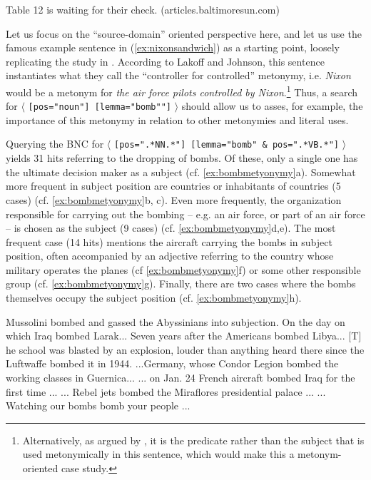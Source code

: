 \begin{exe}
\ex Table 12 is waiting for their check. (articles.baltimoresun.com)
\label{ex:tablecheck}
\end{exe}

Let us focus on the ``source-domain'' oriented perspective here, and let us use the famous example sentence in (\ref{ex:nixonsandwich}) as a starting point, loosely replicating the study in \citet{stefanowitsch_metonymies_2015}. According to Lakoff and Johnson, this sentence instantiates what they call the ``controller for controlled'' metonymy, i.e. \textit{Nixon} would be a metonym for \textit{the air force pilots controlled by Nixon}.\footnote{Alternatively, as argued by \citet{stallard_two_1993}, it is the predicate rather than the subject that is used metonymically in this sentence, which would make this a metonym-oriented case study.} Thus, a search for $\langle$ \texttt{[pos="noun"] [lemma="bomb""]} $\rangle$ should allow us to asses, for example, the importance of this metonymy in relation to other metonymies and literal uses.

Querying the BNC for $\langle$ \texttt{[pos=".*NN.*"] [lemma="bomb" \& pos=".*VB.*"]} $\rangle$ yields 31 hits referring to the dropping of bombs. Of these, only a single one has the ultimate decision maker as a subject (cf. \ref{ex:bombmetyonymy}a). Somewhat more frequent in subject position are countries or inhabitants of countries (5 cases) (cf. \ref{ex:bombmetyonymy}b, c). Even more frequently, the organization responsible for carrying out the bombing -- e.g. an air force, or part of an air force -- is chosen as the subject (9 cases) (cf. \ref{ex:bombmetyonymy}d,e). The most frequent case (14 hits) mentions the aircraft carrying the bombs in subject position, often accompanied by an adjective referring to the country whose military operates the planes (cf \ref{ex:bombmetyonymy}f) or some other responsible group (cf. \ref{ex:bombmetyonymy}g). Finally, there are two cases where the bombs themselves occupy the subject position (cf. \ref{ex:bombmetyonymy}h).

\begin{exe}
\ex
\begin{xlist} 
\label{ex:bombmetyonymy}
\ex Mussolini bombed and gassed the Abyssinians into subjection.
\ex On the day on which Iraq bombed Larak...
\ex Seven years after the Americans bombed Libya...
\ex $[$T$]$he school was blasted by an explosion, louder than anything heard there since the Luftwaffe bombed it in 1944.
\ex ...Germany, whose Condor Legion bombed the working classes in Guernica...
\ex ... on Jan. 24 French aircraft bombed Iraq for the first time ...
\ex ... Rebel jets bombed the Miraflores presidential palace ...
\ex ... Watching our bombs bomb your people ...
\end{xlist}
\end{exe}

